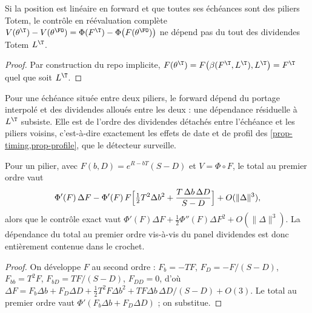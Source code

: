 \begin{theorem}\label{thm-exact}
Si la position est linéaire en forward et que toutes ses échéances sont des piliers Totem, le contrôle en
réévaluation complète $V(\theta^\T)-V(\theta^\FO)=\Phi(F^\T)-\Phi\bigl(F(\theta^\FO)\bigr)$ ne dépend pas du tout des
dividendes Totem $L^\T$.
\end{theorem}
\begin{proof}
Par construction du repo implicite, $F(\theta^\T)=F\bigl(\beta(F^\T,L^\T),L^\T\bigr)=F^\T$ quel que soit $L^\T$.
\end{proof}

\begin{remark}
Pour une échéance située entre deux piliers, le forward dépend du portage interpolé et des dividendes alloués entre
les deux : une dépendance résiduelle à $L^\T$ subsiste. Elle est de l'ordre des dividendes détachés entre l'échéance et
les piliers voisins, c'est-à-dire exactement les effets de date et de profil des \cref{prop-timing,prop-profile}, que
le détecteur surveille.
\end{remark}

\begin{proposition}\label{prop-second}
Pour un pilier, avec $F(b,D)=e^{R-bT}(S-D)$ et $V=\Phi\circ F$, le total au premier ordre vaut
\begin{equation}\label{eq-second}
\Phi'(F)\,\Delta F-\Phi'(F)\,F\Bigl[\tfrac12T^2\Delta b^2+\frac{T\,\Delta b\,\Delta D}{S-D}\Bigr]+O(\|\Delta\|^3),
\end{equation}
alors que le contrôle exact vaut $\Phi'(F)\Delta F+\tfrac12\Phi''(F)\Delta F^2+O(\|\Delta\|^3)$. La dépendance du total au
premier ordre vis-à-vis du panel dividendes est donc entièrement contenue dans le crochet.
\end{proposition}
\begin{proof}
On développe $F$ au second ordre : $F_b=-TF$, $F_D=-F/(S-D)$, $F_{bb}=T^2F$, $F_{bD}=TF/(S-D)$, $F_{DD}=0$, d'où
$\Delta F=F_b\Delta b+F_D\Delta D+\tfrac12T^2F\Delta b^2+TF\Delta b\,\Delta D/(S-D)+O(3)$. Le total au premier ordre vaut
$\Phi'(F_b\Delta b+F_D\Delta D)$ ; on substitue.
\end{proof}

